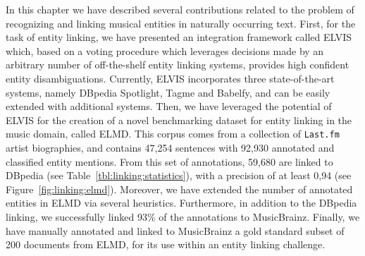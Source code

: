 In this chapter we have described several contributions related to the problem of recognizing and linking musical entities in naturally occurring text. First, for the task of entity linking, we have presented an integration framework called \textsc{ELVIS} which, based on a voting procedure which leverages decisions made by an arbitrary number of off-the-shelf entity linking systems, provides high confident entity disambiguations. Currently, \textsc{ELVIS} incorporates three state-of-the-art systems, namely DBpedia Spotlight, Tagme and Babelfy, and can be easily extended with additional systems. %
Then, we have leveraged the potential of \textsc{ELVIS} for the creation of a novel benchmarking dataset for entity linking in the music domain, called \textsc{ELMD}. This corpus comes from a collection of \texttt{Last.fm} artist biographies, and contains 47,254 sentences with 92,930 annotated and classified entity mentions. %
From this set of annotations, 59,680 are linked to DBpedia (see Table~\ref{tbl:linking:statistics}), with a precision of at least 0,94 (see Figure~\ref{fig:linking:elmd}).
Moreover, we have extended the number of annotated entities in ELMD via several heuristics. Furthermore, in addition to the DBpedia linking, we successfully linked 93\% of the annotations to MusicBrainz.
Finally, we have manually annotated and linked to MusicBrainz a gold standard subset of 200 documents from ELMD, for its use within an entity linking challenge.
